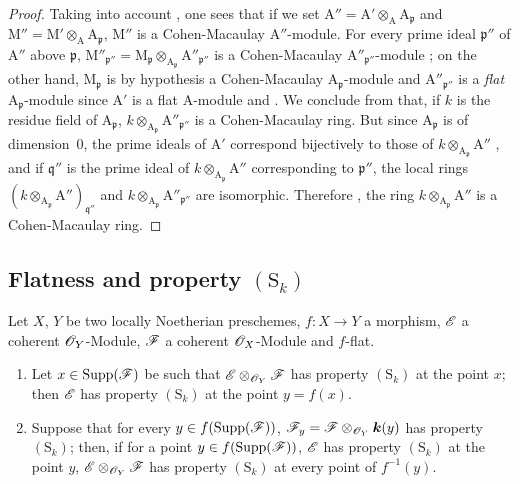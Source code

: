 \begin{proof}
Taking into account , one sees that if we set $\mathrm{A}''=\mathrm{A}'\otimes_\mathrm{A}\mathrm{A}_\mathfrak{p}$ and $\mathrm{M}''=\mathrm{M}'\otimes_\mathrm{A}\mathrm{A}_\mathfrak{p}$, $\mathrm{M}''$ is a Cohen-Macaulay $\mathrm{A}''$-module.
For every prime ideal $\mathfrak{p}''$ of $\mathrm{A}''$ above $\mathfrak{p}$, $\mathrm{M}''_{\mathfrak{p}''}=\mathrm{M}_\mathfrak{p}\otimes_{\mathrm{A}_\mathfrak{p}}\mathrm{A}''_{\mathfrak{p}''}$ is a Cohen-Macaulay $\mathrm{A}''_{\mathfrak{p}''}$-module ; on the other hand, $\mathrm{M}_\mathfrak{p}$ is by hypothesis a Cohen-Macaulay $\mathrm{A}_\mathfrak{p}$-module and $\mathrm{A}''_{\mathfrak{p}''}$ is a \emph{flat} $\mathrm{A}_\mathfrak{p}$-module since $\mathrm{A}'$ is a flat $\mathrm{A}$-module  and .
We conclude from  that, if $k$ is the residue field of $\mathrm{A}_\mathfrak{p}$, $k\otimes_{\mathrm{A}_\mathfrak{p}}\mathrm{A}''_{\mathfrak{p}''}$ is a Cohen-Macaulay ring.
But since $\mathrm{A}_\mathfrak{p}$ is of dimension~$0$, the prime ideals of $\mathrm{A}'$ correspond bijectively to those of $k\otimes_{\mathrm{A}_\mathfrak{p}}\mathrm{A}''$ , and if $\mathfrak{q}''$ is the prime ideal of $k\otimes_{\mathrm{A}_\mathfrak{p}}\mathrm{A}''$ corresponding to $\mathfrak{p}''$, the local rings $(k\otimes_{\mathrm{A}_\mathfrak{p}}\mathrm{A}'')_{\mathfrak{q}''}$ and $k\otimes_{\mathrm{A}_\mathfrak{p}}\mathrm{A}''_{\mathfrak{p}''}$ are isomorphic.
Therefore , the ring $k\otimes_{\mathrm{A}_\mathfrak{p}}\mathrm{A}''$ is a Cohen-Macaulay ring.
\end{proof}

\subsection{Flatness and property \texorpdfstring{$(\mathrm{S}_k)$}{(Sk)}}
\label{subsection:IV.6.4}

\begin{proposition}[6.4.1]
\label{IV.6.4.1}
Let $X$, $Y$ be two locally Noetherian preschemes, $f:X\to Y$ a morphism, $\mathscr{E}$ a coherent $\mathscr{O}_Y$-Module, $\mathscr{F}$ a coherent $\mathscr{O}_X$-Module and $f$-flat.
\begin{enumerate}[label=\upshape(\roman*)]
  \item Let $x\in\operatorname{Supp}(\mathscr{F})$ be such that $\mathscr{E}\otimes_{\mathscr{O}_Y}\mathscr{F}$ has property $(\mathrm{S}_k)$ at the point $x$; then $\mathscr{E}$ has property $(\mathrm{S}_k)$ at the point $y=f(x)$.
  \item Suppose that for every $y\in f(\operatorname{Supp}(\mathscr{F}))$, $\mathscr{F}_y=\mathscr{F}\otimes_{\mathscr{O}_Y}\boldsymbol{k}(y)$ has property $(\mathrm{S}_k)$; then, if for a point $y\in f(\operatorname{Supp}(\mathscr{F}))$, $\mathscr{E}$ has property $(\mathrm{S}_k)$ at the point $y$, $\mathscr{E}\otimes_{\mathscr{O}_Y}\mathscr{F}$ has property $(\mathrm{S}_k)$ at every point of $f^{-1}(y)$.
\end{enumerate}
\end{proposition}

